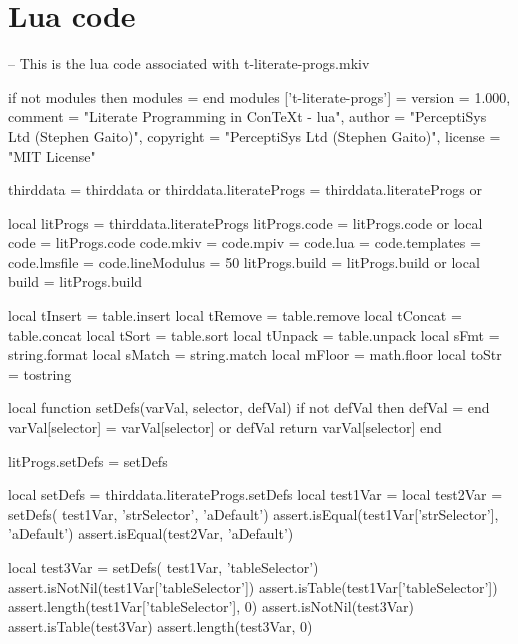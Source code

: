 
\unprotect

\stopMkIVCode

\section{Lua code}

\startLuaCode
-- This is the lua code associated with t-literate-progs.mkiv

if not modules then modules = { } end
modules ['t-literate-progs'] = {
    version   = 1.000,
    comment   = "Literate Programming in ConTeXt - lua",
    author    = "PerceptiSys Ltd (Stephen Gaito)",
    copyright = "PerceptiSys Ltd (Stephen Gaito)",
    license   = "MIT License"
}

thirddata               = thirddata               or {}
thirddata.literateProgs = thirddata.literateProgs or {}

local litProgs   = thirddata.literateProgs
litProgs.code    = litProgs.code or {}
local code       = litProgs.code
code.mkiv        = {}
code.mpiv        = {}
code.lua         = {}
code.templates   = {}
code.lmsfile     = {}
code.lineModulus = 50
litProgs.build   = litProgs.build or {}
local build      = litProgs.build

local tInsert = table.insert
local tRemove = table.remove
local tConcat = table.concat
local tSort   = table.sort
local tUnpack = table.unpack
local sFmt    = string.format
local sMatch  = string.match
local mFloor  = math.floor
local toStr   = tostring
\stopLuaCode

\startTestSuite[setDefs]

\startLuaCode
local function setDefs(varVal, selector, defVal)
  if not defVal then defVal = { } end
  varVal[selector] = varVal[selector] or defVal
  return varVal[selector]
end

litProgs.setDefs = setDefs
\stopLuaCode

\startLuaTest
  local setDefs = thirddata.literateProgs.setDefs
  local test1Var = { }
  local test2Var = setDefs( test1Var, 'strSelector', 'aDefault')
  assert.isEqual(test1Var['strSelector'], 'aDefault')
  assert.isEqual(test2Var, 'aDefault')

  local test3Var = setDefs( test1Var, 'tableSelector')
  assert.isNotNil(test1Var['tableSelector'])
  assert.isTable(test1Var['tableSelector'])
  assert.length(test1Var['tableSelector'], 0)
  assert.isNotNil(test3Var)
  assert.isTable(test3Var)
  assert.length(test3Var, 0)
\stopLuaTest
\stopTestCase
\stopTestSuite


